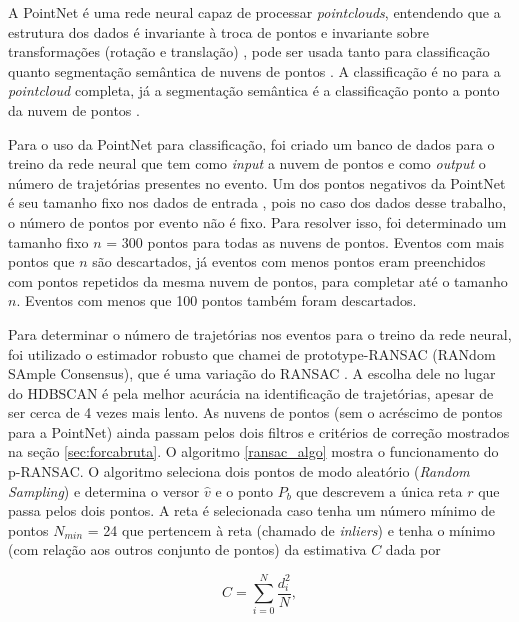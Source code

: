 \documentclass[a4paper,12pt,oneside]{book}
\begin{document}
\par A PointNet é uma rede neural capaz de processar \textit{pointclouds}, entendendo que a estrutura dos dados é invariante à troca de pontos e invariante sobre transformações (rotação e translação) \cite{RF_pc}, pode ser usada tanto para classificação quanto segmentação semântica de nuvens de pontos \cite{qi2016pointnet}. A classificação é no para a \textit{pointcloud} completa, já a segmentação semântica é a classificação ponto a ponto da nuvem de pontos \cite{qi2016pointnet}.

\par  Para o uso da PointNet para classificação, foi criado um banco de dados para o treino da rede neural que tem como \textit{input} a nuvem de pontos e como \textit{output} o número de trajetórias presentes no evento. Um dos pontos negativos da PointNet é seu tamanho fixo nos dados de entrada \cite{qi2016pointnet}, pois no caso dos dados desse trabalho, o número de pontos por evento não é  fixo. Para resolver isso, foi determinado um tamanho fixo $n$ = 300 pontos para todas as nuvens de pontos. Eventos com mais pontos que $n$ são descartados, já eventos com menos pontos eram preenchidos com pontos repetidos da mesma nuvem de pontos, para completar até o tamanho $n$. Eventos com menos que 100 pontos também foram descartados.

\par Para determinar o número de trajetórias nos eventos para o treino da rede neural, foi utilizado o estimador robusto que chamei de prototype-RANSAC (RANdom SAmple Consensus), que é uma variação do RANSAC  \cite{ransac, artigo}. A escolha dele no lugar do HDBSCAN é pela melhor acurácia na identificação de trajetórias, apesar de ser cerca de 4 vezes mais lento. As nuvens de pontos (sem o acréscimo de pontos para a PointNet) ainda passam pelos dois filtros e critérios de correção mostrados na seção \ref{sec:forcabruta}. O algoritmo \ref{ransac_algo} mostra o funcionamento do p-RANSAC. O algoritmo seleciona dois pontos de modo aleatório (\textit{Random Sampling}) e determina o versor $\hat{v}$ e o ponto $P_b$ que descrevem a única reta $r$ que passa pelos dois pontos. A reta é selecionada caso tenha um número mínimo de pontos $N_{min}$ = 24 que pertencem à reta (chamado de \textit{inliers}) e tenha o mínimo (com relação aos outros conjunto de pontos) da estimativa $C$ dada por \cite{artigo}

\begin{equation} \label{criterio_ransac}
    C = \sum_{i = 0}^{N} \frac{d_i ^2}{N},
\end{equation}
\end{document}
